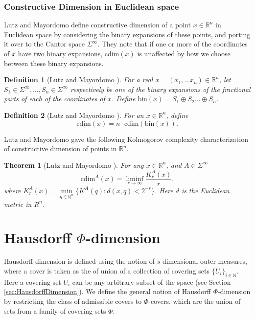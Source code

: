 \documentclass[11pt]{article}
\newtheorem{theorem}{Theorem}
\newtheorem{definition}{Definition}
\newcommand{\N}{\mathbb{N}}
\newcommand{\Q}{\mathbb{Q}}
\newcommand{\R}{\mathbb{R}}
\newcommand{\cdim}{\mathrm{cdim}}
\newcommand{\x}{x}
\begin{document}
\subsubsection{Constructive Dimension in Euclidean space}

Lutz and Mayordomo \cite{Lutz2008a} define constructive dimension of a point $x \in \R^n$ in Euclidean space by considering the binary expansions of these points, and porting it over to the Cantor space $\Sigma^\infty$. They note that if one or more of the coordinates of $x$ have two binary expansions, $\cdim(x)$ is unaffected by how we choose between these binary expansions.

\begin{definition} [Lutz and 
	Mayordomo \cite{Lutz2008a}]
	For a real $x = (x_1,...x_n) \in \R^n$, let $S_1 \in \Sigma^\infty,\dots,S_n \in \Sigma^\infty$ respectively be one of the binary expansions of the fractional parts of each of the coordinates of $x$. Define $\mathrm{bin}(x) = S_1 \oplus S_2 \dots \oplus S_n$. 
\end{definition}


\begin{definition} [Lutz and 
	Mayordomo \cite{Lutz2008a}]
		For an $x \in \R^n$, define
		$$\cdim(x) = n \cdot \cdim(\mathrm{bin}(x)).$$
\end{definition}

 Lutz and 
Mayordomo \cite{Lutz2008a} gave the following 
Kolmogorov complexity characterization of constructive dimension of points in $\R^n$.

\begin{theorem}[Lutz and 
	Mayordomo \cite{Lutz2008a}] \label{thm:CdimusingK}
	For any $\x \in \R^n$, and $A \in \Sigma^\infty$ 
	$$\cdim^A(\x) =
	\liminf\limits_{r\to\infty} \frac{K^A_r(\x)}{r}.$$
	where $K_r^A(\x) = \min\limits_{q \in \Q^n}\{K^A(q) : d(x,q) < 2^{-r}\}$.  Here $d$ is the Euclidean metric in $R^n$.
\end{theorem}



\section{ Hausdorff $\Phi$-dimension }  \label{sec:PhiDim}

Hausdorff dimension is defined using the notion of $s$-dimensional outer measures, where a cover is taken as the of union of a collection of covering sets $\{U_i\}_{i \in \N}$. Here a covering set $U_i$ can be any arbitrary subset of the space (see Section \ref{sec:HausdorffDimension}).
We define the general notion of Hausdorff $\Phi$-dimension by
restricting the class of admissible covers to $\Phi$-covers, which are the union of sets from a family of covering sets $\Phi$. 
\end{document}
